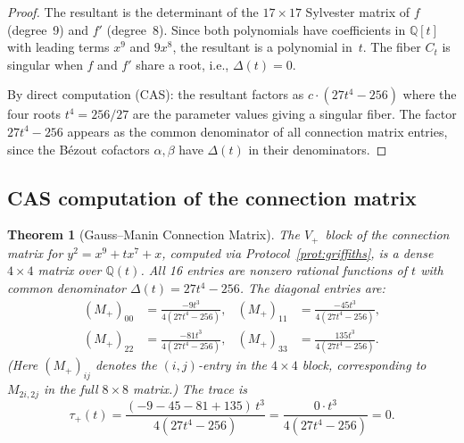 \documentclass[11pt]{article}
\theoremstyle{plain}
\newtheorem{theorem}{Theorem}[section]
\theoremstyle{definition}
\theoremstyle{remark}
\newcommand{\Q}{\mathbb{Q}}
\begin{document}
\begin{proof}
The resultant is the determinant of the $17 \times 17$ Sylvester matrix
of $f$ (degree~9) and $f'$ (degree~8).  Since both polynomials have
coefficients in $\Q[t]$ with leading terms $x^9$ and $9x^8$, the
resultant is a polynomial in~$t$.  The fiber $C_t$ is singular when
$f$ and $f'$ share a root, i.e., $\Delta(t) = 0$.

By direct computation (CAS): the resultant factors as
$c \cdot (27t^4 - 256)$ where the four roots $t^4 = 256/27$ are
the parameter values giving a singular fiber.  The factor
$27t^4 - 256$ appears as the common denominator of all connection
matrix entries, since the B\'ezout cofactors $\alpha, \beta$ have
$\Delta(t)$ in their denominators.
\end{proof}

\subsection{CAS computation of the connection matrix}

\begin{theorem}[Gauss--Manin Connection Matrix]\label{thm:cas}
The $V_+$~block of the connection matrix for $y^2 = x^9 + tx^7 + x$,
computed via Protocol~\ref{prot:griffiths}, is a dense $4 \times 4$
matrix over $\Q(t)$.  All 16 entries are nonzero rational functions
of $t$ with common denominator $\Delta(t) = 27t^4 - 256$.
The diagonal entries are:
\begin{align*}
  (M_+)_{00} &= \frac{-9t^3}{4(27t^4 - 256)}, &
  (M_+)_{11} &= \frac{-45t^3}{4(27t^4 - 256)}, \\
  (M_+)_{22} &= \frac{-81t^3}{4(27t^4 - 256)}, &
  (M_+)_{33} &= \frac{135t^3}{4(27t^4 - 256)}.
\end{align*}
(Here $(M_+)_{ij}$ denotes the $(i,j)$-entry in the $4 \times 4$
block, corresponding to $M_{2i,2j}$ in the full $8 \times 8$ matrix.)
The trace is
\[
  \tau_+(t) = \frac{(-9 - 45 - 81 + 135)\, t^3}{4(27t^4 - 256)}
  = \frac{0 \cdot t^3}{4(27t^4 - 256)} = 0.
\]
\end{theorem}
\end{document}

